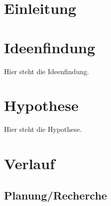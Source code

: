 \documentclass{Bericht}
\begin{document}
\maketitle


\tableofcontents
\clearpage

\section{Einleitung}

\section{Ideenfindung}
	Hier steht die Ideenfindung.

\section{Hypothese}
		Hier steht die Hypothese.

\clearpage
\section{Verlauf}
	\subsection{Planung/Recherche} %
	
\end{document}
